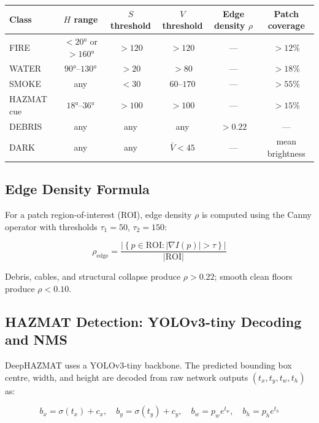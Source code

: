 \documentclass[12pt,a4paper]{article}
\begin{document}
\begin{center}
\begin{tabular}{l c c c c c}
  \toprule
  Class & $H$ range & $S$ threshold & $V$ threshold
        & Edge density $\rho$ & Patch coverage \\
  \midrule
  FIRE    & $<20°$ or $>160°$ & $>120$ & $>120$ & ---   & $>12\%$ \\
  WATER   & $90°$--$130°$      & $>20$  & $>80$  & ---   & $>18\%$ \\
  SMOKE   & any                & $<30$  & $60$--$170$ & --- & $>55\%$ \\
  HAZMAT cue & $18°$--$36°$   & $>100$ & $>100$ & ---   & $>15\%$ \\
  DEBRIS  & any                & any    & any    & $>0.22$ & --- \\
  DARK    & any                & any    & $\bar V < 45$ & --- & mean brightness \\
  \bottomrule
\end{tabular}
\end{center}

\subsection{Edge Density Formula}

For a patch region-of-interest (ROI), edge density $\rho$ is computed
using the Canny operator with thresholds $\tau_1 = 50$, $\tau_2 = 150$:

\begin{equation}
  \rho_{\text{edge}}
  = \frac{\left|\left\{p \in \text{ROI} : |\nabla I(p)| > \tau\right\}\right|}{|\text{ROI}|}
  \tag{18}
\end{equation}

Debris, cables, and structural collapse produce $\rho > 0.22$;
smooth clean floors produce $\rho < 0.10$.

\subsection{HAZMAT Detection: YOLOv3-tiny Decoding and NMS}

DeepHAZMAT uses a YOLOv3-tiny backbone. The predicted bounding box
centre, width, and height are decoded from raw network outputs
$(t_x, t_y, t_w, t_h)$ as:

\begin{equation}
  b_x = \sigma(t_x) + c_x, \quad
  b_y = \sigma(t_y) + c_y, \quad
  b_w = p_w e^{t_w}, \quad
  b_h = p_h e^{t_h}
  \tag{19}
\end{equation}
\end{document}
